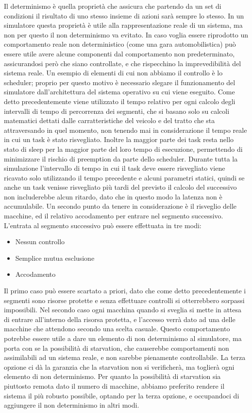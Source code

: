 Il determinismo è quella proprietà che assicura che partendo da un set di condizioni il risultato di uno stesso insieme di azioni sarà sempre lo stesso. In un simulatore questa proprietà è utile alla rappresentazione reale di un sistema, ma non per questo il non determinismo va evitato. In caso voglia essere riprodotto un comportamento reale non deterministico (come una gara automobilistica) può essere utile avere alcune componenti dal comportamento non predeterminato, assicurandosi però che siano controllate, e che rispecchino la imprevedibilità del sistema reale.
Un esempio di elementi di cui non abbiamo il controllo è lo scheduler; proprio per questo motivo è necessario slegare il funzionamento del simulatore dall’architettura del sistema operativo su cui viene eseguito. 
Come detto precedentemente viene utilizzato il tempo relativo per ogni calcolo degli intervalli di tempo di percorrenza dei segmenti, che si basano solo su calcoli matematici dettati dalle carratteristiche del veicolo e del tratto che sta attraversando in quel momento, non tenendo mai in considerazione il tempo reale in cui un task è stato risvegliato. Inoltre la maggior parte dei task resta nello stato di sleep per la maggior parte del loro tempo di esecuzione, permettendo di minimizzare il rischio di preemption da parte dello scheduler. Durante tutta la simulazione l’intervallo di tempo in cui il task deve essere risvegliato viene ricavato solo utilizzando il tempo precedente e alcuni parametri statici, quindi se anche un task venisse risvegliato più tardi del previsto il calcolo del successivo non includerebbe alcun ritardo, dato che in questo modo la latenza non è accumulabile.
Un secondo punto da tenere in considerazione è il risveglio delle macchine, ed il relativo accodamento per entrare nel segmento successivo.
L’entrata al segmento successivo può essere effettuata in tre modi:
\begin{itemize}
 \item Nessun controllo
 \item Semplice mutua esclusione
 \item Accodamento
\end{itemize}
Il primo caso può essere scartato a priori, dato che come detto precedentemente i segmenti sono risorse protette e senza effettuare controlli si otterrebbero sorpassi impossibili.
Nel secondo caso ogni macchina quando si sveglia si mette in attesa di entrare all’interno della risorsa protetta, e l’accesso verrà dato ad una delle macchine che attendono secondo una scelta casuale. Questo comportamento potrebbe essere utile a dare un elemento di non determinismo al simulatore, ma porta con se la possibilità di starvation, che causerebbe comportamenti non assimilabili ad un sistema reale, e non sarebbe pienamente controllabile.
La terza opzione ci dà la garanzia che la starvation non si verificherà, ma toglierà ogni elemento di non determinismo.
Per quanto la possibilità di starvation sia piuttosto remota dato il numero di macchine, abbiamo preferito rendere il sistema il più robusto possibile, optando per la terza opzione, e occupandoci di aggiungere il non determinismo in altri modi.

